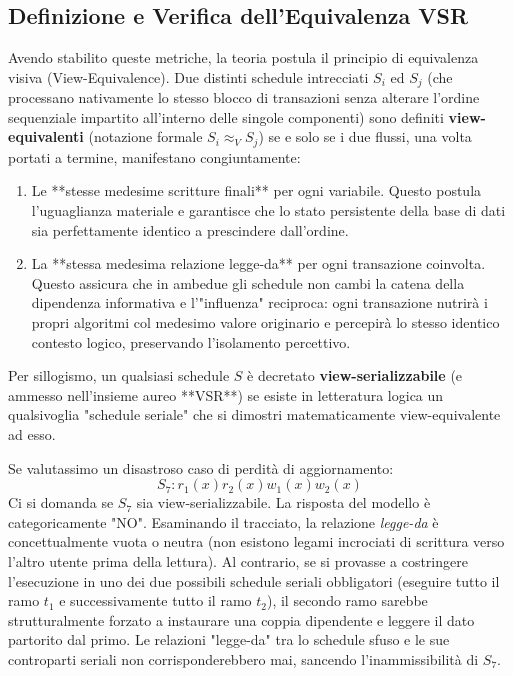 \subsection{Definizione e Verifica dell'Equivalenza VSR}
Avendo stabilito queste metriche, la teoria postula il principio di equivalenza visiva (View-Equivalence).
Due distinti schedule intrecciati $S_i$ ed $S_j$ (che processano nativamente lo stesso blocco di transazioni senza alterare l'ordine sequenziale impartito all'interno delle singole componenti) sono definiti \textbf{view-equivalenti} (notazione formale $S_i \approx_V S_j$) se e solo se i due flussi, una volta portati a termine, manifestano congiuntamente:
\begin{enumerate}
    \item Le **stesse medesime scritture finali** per ogni variabile. Questo postula l'uguaglianza materiale e garantisce che lo stato persistente della base di dati sia perfettamente identico a prescindere dall'ordine.
    \item La **stessa medesima relazione legge-da** per ogni transazione coinvolta. Questo assicura che in ambedue gli schedule non cambi la catena della dipendenza informativa e l'"influenza" reciproca: ogni transazione nutrirà i propri algoritmi col medesimo valore originario e percepirà lo stesso identico contesto logico, preservando l'isolamento percettivo.
\end{enumerate}

Per sillogismo, un qualsiasi schedule $S$ è decretato \textbf{view-serializzabile} (e ammesso nell'insieme aureo **VSR**) se esiste in letteratura logica un qualsivoglia "schedule seriale" che si dimostri matematicamente view-equivalente ad esso.

Se valutassimo un disastroso caso di perdità di aggiornamento:
$$S_7: r_1(x) r_2(x) w_1(x) w_2(x)$$
Ci si domanda se $S_7$ sia view-serializzabile. La risposta del modello è categoricamente "NO". Esaminando il tracciato, la relazione \textit{legge-da} è concettualmente vuota o neutra (non esistono legami incrociati di scrittura verso l'altro utente prima della lettura). Al contrario, se si provasse a costringere l'esecuzione in uno dei due possibili schedule seriali obbligatori (eseguire tutto il ramo $t_1$ e successivamente tutto il ramo $t_2$), il secondo ramo sarebbe strutturalmente forzato a instaurare una coppia dipendente e leggere il dato partorito dal primo. Le relazioni "legge-da" tra lo schedule sfuso e le sue controparti seriali non corrisponderebbero mai, sancendo l'inammissibilità di $S_7$.

